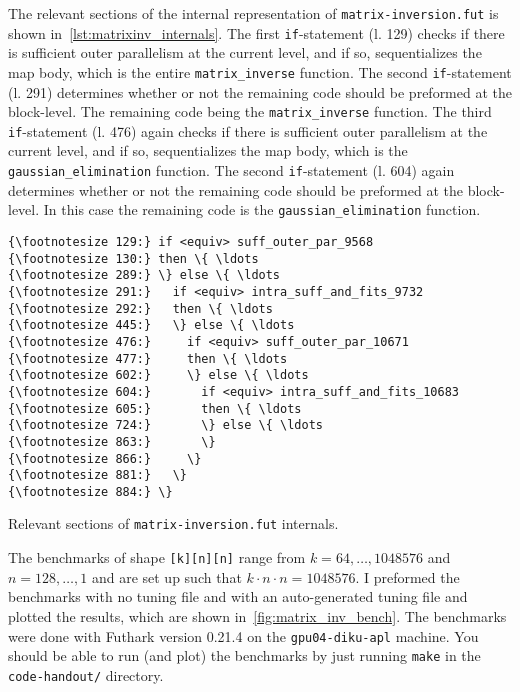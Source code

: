 \documentclass{article}
\begin{document}
\vspace{1em}

\noindent
The relevant sections of the internal representation of
\verb|matrix-inversion.fut| is shown in~\cref{lst:matrixinv_internals}.
The first \texttt{if}-statement (l. 129) checks if there is sufficient outer
parallelism at the current level, and if so, sequentializes the map body, which
is the entire \verb|matrix_inverse| function.
The second \texttt{if}-statement (l. 291) determines whether or not the
remaining code should be preformed at the block-level. The
remaining code being the \verb|matrix_inverse| function.
The third \texttt{if}-statement (l. 476) again checks if there is sufficient
outer parallelism at the current level, and if so, sequentializes the map body,
which is the \verb|gaussian_elimination| function.
The second \texttt{if}-statement (l. 604) again determines whether or not the
remaining code should be preformed at the block-level. In this case the
remaining code is the \verb|gaussian_elimination| function.

\begin{listing}[t]
    \begin{Verbatim}[frame=single,commandchars=\\\{\}]
{\footnotesize 129:} if <equiv> suff_outer_par_9568
{\footnotesize 130:} then \{ \ldots
{\footnotesize 289:} \} else \{ \ldots
{\footnotesize 291:}   if <equiv> intra_suff_and_fits_9732
{\footnotesize 292:}   then \{ \ldots
{\footnotesize 445:}   \} else \{ \ldots
{\footnotesize 476:}     if <equiv> suff_outer_par_10671
{\footnotesize 477:}     then \{ \ldots
{\footnotesize 602:}     \} else \{ \ldots
{\footnotesize 604:}       if <equiv> intra_suff_and_fits_10683
{\footnotesize 605:}       then \{ \ldots
{\footnotesize 724:}       \} else \{ \ldots
{\footnotesize 863:}       \}
{\footnotesize 866:}     \}
{\footnotesize 881:}   \}
{\footnotesize 884:} \}
    \end{Verbatim}
    \caption{Relevant sections of \texttt{matrix-inversion.fut} internals.}
    \label{lst:matrixinv_internals}
\end{listing}

The benchmarks of shape \texttt{[k][n][n]} range from $k = 64, \ldots , 1048576$
and $n = 128, \ldots , 1$ and are set up such that $k \cdot n \cdot n =
1048576$. I preformed the benchmarks with no tuning file and with an
auto-generated tuning file and plotted the results, which are shown
in~\cref{fig:matrix_inv_bench}. The benchmarks were done with Futhark version
0.21.4 on the \verb|gpu04-diku-apl| machine. You should be able to run (and
plot) the benchmarks by just running \verb|make| in the \verb|code-handout/|
directory.
\end{document}
